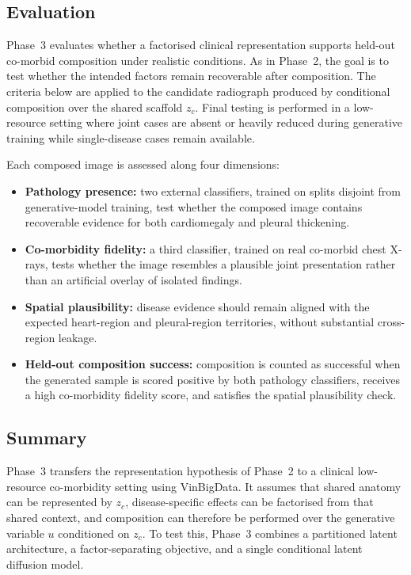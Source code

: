 \subsection{Evaluation}
\label{subsec:p3_eval}

Phase~3 evaluates whether a factorised clinical representation supports held-out co-morbid composition under realistic conditions. 
As in Phase~2, the goal is to test whether the intended factors remain recoverable after composition. The criteria below are applied to the candidate radiograph produced by conditional composition over the shared scaffold \(z_c\).
Final testing is performed in a low-resource setting where joint cases are absent or heavily reduced during generative training while single-disease cases remain available.

Each composed image is assessed along four dimensions:
\begin{itemize}
    \item \textbf{Pathology presence:} two external classifiers, trained on splits disjoint from generative-model training, test whether the composed image contains recoverable evidence for both cardiomegaly and pleural thickening.

    \item \textbf{Co-morbidity fidelity:} a third classifier, trained on real co-morbid chest X-rays, tests whether the image resembles a plausible joint presentation rather than an artificial overlay of isolated findings.

    \item \textbf{Spatial plausibility:} disease evidence should remain aligned with the expected heart-region and pleural-region territories, without substantial cross-region leakage.

    \item \textbf{Held-out composition success:} composition is counted as successful when the generated sample is scored positive by both pathology classifiers, receives a high co-morbidity fidelity score, and satisfies the spatial plausibility check.
\end{itemize}


\subsection{Summary}

Phase~3 transfers the representation hypothesis of Phase~2 to a clinical low-resource co-morbidity setting using VinBigData. It assumes that shared anatomy can be represented by \(z_c\), disease-specific effects can be factorised from that shared context, and composition can therefore be performed over the generative variable \(u\) conditioned on \(z_c\). To test this, Phase~3 combines a partitioned latent architecture, a factor-separating objective, and a single conditional latent diffusion model.

